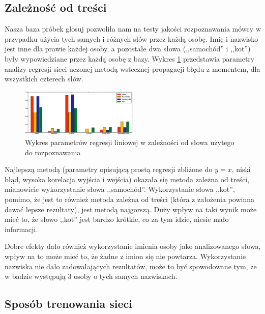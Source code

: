 \documentclass[journal]{IEEEtran}
\begin{document}
\subsection{Zależność od treści}

Nasza baza próbek glosuj pozwoliła nam na testy jakości rozpoznawania mówcy w
przypadku użycia tych samych i różnych słów przez każdą osobę. Imię i nazwisko
jest inne dla prawie każdej osoby, a pozostałe dwa słowa (,,samochód'' i
,,kot'') były wypowiedziane przez każdą osobę z bazy. Wykres \ref{fig:word}
przedstawia parametry analizy regresji sieci uczonej metodą wstecznej
propagacji błędu z momentem, dla wszystkich czterech słów.

\begin{figure}[h!]
    \includegraphics[width=0.5\textwidth]{word_network_reggresion}
    \caption{Wykres parametrów regresji liniowej w zależności od słowa użytego
    do rozpoznawania}
    \label{fig:word}
\end{figure}

Najlepszą metodą (parametry opisującą prostą regresji zbliżone do $y=x$, niski
błąd, wysoka korelacja wyjścia i wejścia) okazała się metoda zależna od treści,
mianowicie wykorzystanie słowa ,,samochód''. Wykorzystanie słowa ,,kot'',
pomimo, że jest to również metoda zależna od treści (która z założenia powinna
dawać lepsze rezultaty), jest metodą najgorszą. Duży wpływ na taki wynik może
mieć to, że słowo ,,kot'' jest bardzo krótkie, co za tym idzie, niesie mało
informacji.

Dobre efekty dało również wykorzystanie imienia osoby jako analizowanego słowa,
wpływ na to może mieć to, że żadne z imion się nie powtarza. Wykorzystanie
nazwiska nie dało zadowalających rezultatów, może to być spowodowane tym, że w
badzie występują 3 osoby o tych samych nazwiskach.

\subsection{Sposób trenowania sieci}
\end{document}
